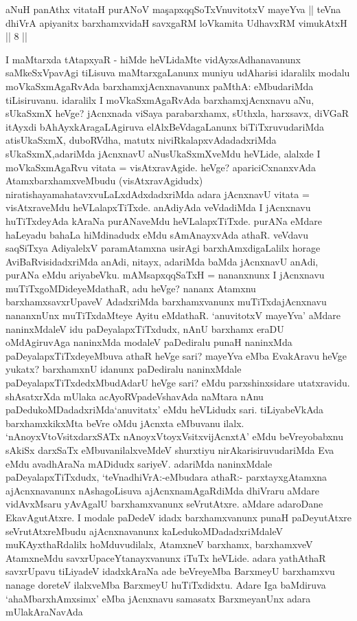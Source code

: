 

\begin{shl}
aNuH panAthx vitataH purANoV ma\c sapxqqSoTxV\s nuvitotxV mayeYva ||
teVna dhiVrA apiyanitx barxhamxvidaH savxgaRM loVkamita UdhavxRM vimukAtxH || 8 ||
\end{shl}

\begin{artha}
I maMtarxda tAtapxyaR - hiMde heVLidaMte vidAyxsAdhanavanunx saMkeSxVpavAgi tiLisuva maMtarxgaLanunx muniyu udAharisi idaralilx modalu moVkaSxmAgaRvAda barxhamxjAcnxnavanunx paMthA: eMbudariMda tiLisiruvanu. idaralilx I moVkaSxmAgaRvAda barxhamxjAcnxnavu aNu, sUkaSxmX heVge? jAcnxnada viSaya parabarxhamx, sUthxla, harxsavx, diVGaR itAyxdi bAhAyxkAragaLAgiruva elAlxBeVdagaLanunx biTiTxruvudariMda atisUkaSxmX, duboRVdha, matutx niviRkalapxvAdadadxriMda sUkaSxmX,\break adariMda jAcnxnavU aNusUkaSxmXveMdu heVLide, alalxde I moVkaSxmAgaRvu vitata = visAtxravAgide. heVge? apariciCxnanxvAda AtamxbarxhamxveMbudu (visAtxravAgidudx) niratishayamahatavxvuLaLxdAdxdadxriMda adara jAcnxnavU vitata = visAtxraveMdu heVLalapxTiTxde. anAdiyAda veVdadiMda I jAcnxnavu huTiTxdeyAda kAraNa purANaveMdu heVLalapxTiTxde. purANa eMdare haLeyadu bahaLa hiMdinadudx eMdu sAmAnayxvAda athaR. veVdavu saqSiTxya AdiyalelxV paramAtamxna usirAgi barxhAmxdigaLalilx horage AviBaRvisidadxriMda anAdi, nitayx, adariMda baMda jAcnxnavU anAdi, purANa eMdu ariyabeVku. mAMsapxqqSaTxH = nananxnunx I jAcnxnavu muTiTxgoMDideyeMdathaR, adu heVge? nananx Atamxnu barxhamxsavxrUpaveV AdadxriMda barxhamxvanunx muTiTxdajAcnxnavu nananxnUnx muTiTxdaMteye Ayitu eMdathaR. `anuvitotxV mayeYva' aMdare naninxMdaleV idu paDeyalapxTiTxdudx, nAnU barxhamx eraDU oMdAgiruvAga naninxMda modaleV paDediralu punaH naninxMda paDeyalapxTiTxdeyeMbuva athaR heVge sari? mayeYva eMba EvakAravu heVge yukatx? barxhamxnU idanunx paDediralu naninxMdale paDeyalapxTiTxdedxMbudAdarU heVge sari? eMdu parxshinxsidare utatxravidu. shAsatxrXda mUlaka acAyoRVpadeVshavAda naMtara nAnu paDedukoMDadadxriMda\break `anuvitatx' eMdu heVLidudx sari. tiLiyabeVkAda barxhamxkikxMta beVre oMdu jAcnxta eMbuvanu ilalx. `nAnoyxV\s toV\s sitxdarxSATx nAnoyxVtoyxVsitxvijAcnxtA' eMdu beVreyobabxnu sAkiSx darxSaTx eMbuvanilalxveMdeV shurxtiyu nirAkarisiruvudariMda Eva eMdu avadhAraNa mADidudx sariyeV. adariMda naninxMdale paDeyalapxTiTxdudx, `teVnadhiVrA:-\break eMbudara athaR:- parxtayxgAtamxna ajAcnxnavanunx nAshagoLisuva ajAcnxnamAgaRdiMda dhiVraru aMdare vidAvxMsaru yAvAgalU barxhamxvanunx seVrutAtxre. aMdare adaroDane EkavAgutAtxre. I modale paDedeV idadx barxhamxvanunx punaH paDeyutAtxre seVrutAtxreMbudu ajAcnxnavanunx kaLedukoMDadadxriMdaleV muKAyxthaRdalilx hoMduvudilalx, AtamxneV barxhamx, barxhamxveV AtamxneMdu savxrUpaceYtanayxvanunx iTuTx heVLide. adara yathAthaR savxrUpavu tiLiyadeV idadxkAraNa ade beVreyeMba BarxmeyU barxhamxvu nanage doreteV ilalxveMba BarxmeyU huTiTxdidxtu. Adare Iga baMdiruva `ahaMbarxhAmxsimx' eMba jAcnxnavu samasatx BarxmeyanUnx adara mUlakAraNavAda 
\end{artha}
